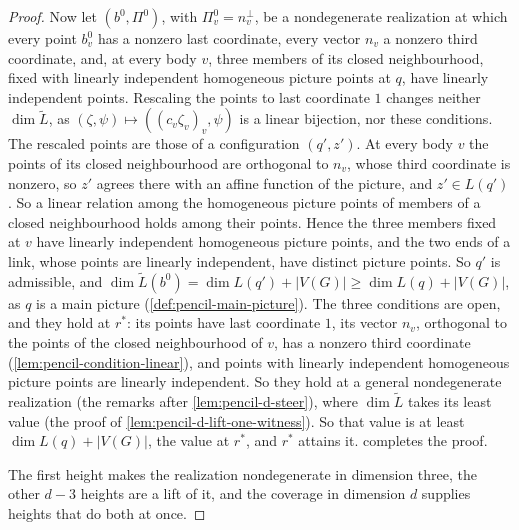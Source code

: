 \begin{proof}
  Now let $(b^0, \Pi^0)$, with $\Pi^0_v = n_v^{\perp}$, be a
  nondegenerate realization at which every point $b^0_v$ has a nonzero
  last coordinate, every vector $n_v$ a nonzero third coordinate, and, at
  every body $v$, three members of its closed neighbourhood, fixed with
  linearly independent homogeneous picture points at $q$, have linearly
  independent points. Rescaling the points to last coordinate $1$ changes
  neither $\dim \widetilde L$, as
  $(\zeta, \psi) \mapsto ((c_v \zeta_v)_v, \psi)$ is a linear bijection,
  nor these conditions. The rescaled points are those of a configuration
  $(q', z')$. At every body $v$ the points of its closed neighbourhood
  are orthogonal to $n_v$, whose third coordinate is nonzero, so $z'$
  agrees there with an affine function of the picture, and
  $z' \in L(q')$. So a linear relation among the homogeneous picture
  points of members of a closed neighbourhood holds among their points.
  Hence the three members fixed at $v$ have linearly independent
  homogeneous picture points, and the two ends of a link, whose points
  are linearly independent, have distinct picture points. So $q'$ is
  admissible, and
  $\dim \widetilde L(b^0) = \dim L(q') + |V(G)| \ge \dim L(q) + |V(G)|$,
  as $q$ is a main picture (\cref{def:pencil-main-picture}). The three
  conditions are open, and they hold at $r^*$: its points have last
  coordinate $1$, its vector $n_v$, orthogonal to the points of the
  closed neighbourhood of $v$, has a nonzero third coordinate
  (\cref{lem:pencil-condition-linear}), and points with linearly
  independent homogeneous picture points are linearly independent. So
  they hold at a general nondegenerate realization (the remarks after
  \cref{lem:pencil-d-steer}), where $\dim \widetilde L$ takes its least
  value (the proof of \cref{lem:pencil-d-lift-one-witness}). So that
  value is at least $\dim L(q) + |V(G)|$, the value at $r^*$, and $r^*$
  attains it.
   completes the proof.

  The first height makes the realization nondegenerate in dimension
  three, the other $d - 3$ heights are a lift of it, and the coverage in
  dimension $d$ supplies heights that do both at once.
\end{proof}

